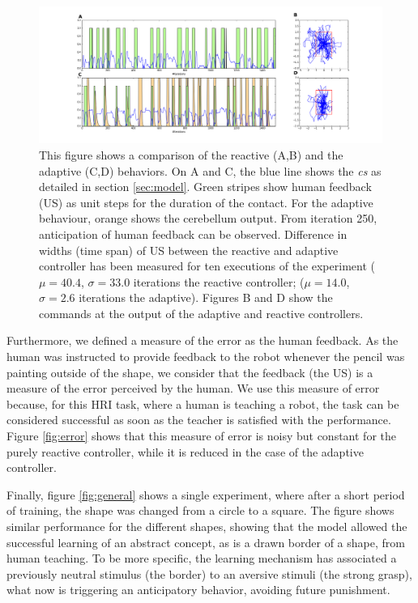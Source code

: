 \documentclass[letterpaper, 10 pt, conference]{ieeeconf}  %
\begin{document}
\begin{figure}
\centering
\includegraphics[width=20cm]{reactive_adaptive}
\caption{This figure shows a comparison of the reactive (A,B) and the adaptive (C,D) behaviors. On A and C, the blue line shows the \emph{cs} as detailed in section \ref{sec:model}. Green stripes show human feedback (US) as unit steps for the duration of the contact. For the adaptive behaviour, orange shows the cerebellum output. From iteration 250, anticipation of human feedback can be observed. Difference in widths (time span) of US between the reactive and adaptive controller has been measured for ten executions of the experiment ($ \mu = 40.4 $, $ \sigma = 33.0$ iterations the reactive controller; ($ \mu = 14.0 $, $ \sigma = 2.6$ iterations the adaptive). Figures B and D show the commands at the output of the  adaptive and reactive controllers. }
\label{fig:reactive}
\end{figure}

Furthermore, we defined a measure of the error as the human feedback. As the human was instructed to provide feedback to the robot whenever the pencil was painting outside of the shape, we consider that the feedback (the US) is a measure of the error perceived by the human. We use this measure of error because, for this HRI task, where a human is teaching a robot, the task can be considered successful as soon as the teacher is satisfied with the performance. Figure \ref{fig:error} shows that this measure of error is noisy but constant for the purely reactive controller, while it is reduced in the case of the adaptive controller. 

Finally, figure \ref{fig:general} shows a single experiment, where after a short period of training, the shape was changed from a circle to a square. The figure shows similar performance for the different shapes, showing that the model allowed the successful learning of an abstract concept, as is a drawn border of a shape, from human teaching. To be more specific, the learning mechanism has associated a previously neutral stimulus (the border) to an aversive stimuli (the strong grasp), what now is triggering an anticipatory behavior, avoiding future punishment. 
\end{document}
